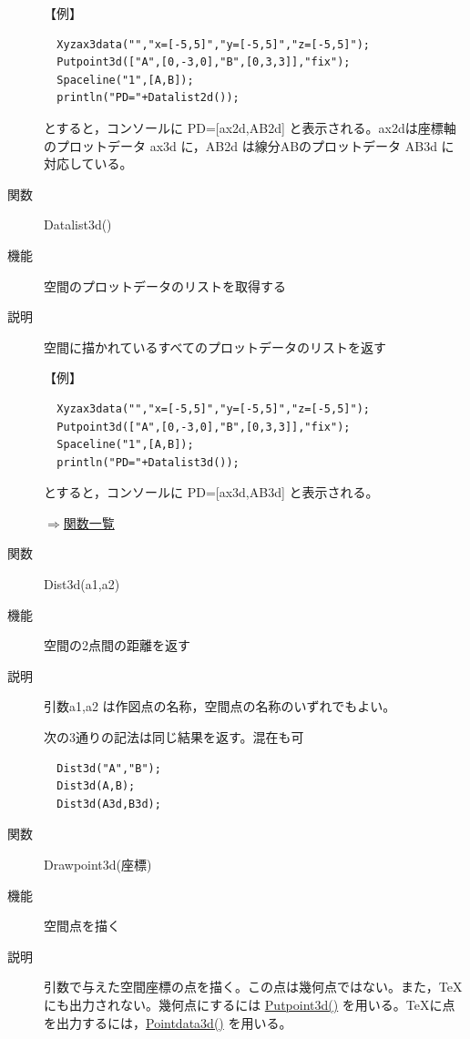 \documentclass[papersize,a4paper,12pt,uplatex]{jsarticle}
\begin{document}
\begin{description}
\vspace{\baselineskip}
【例】
\begin{verbatim}
  Xyzax3data("","x=[-5,5]","y=[-5,5]","z=[-5,5]");
  Putpoint3d(["A",[0,-3,0],"B",[0,3,3]],"fix");
  Spaceline("1",[A,B]);
  println("PD="+Datalist2d());
\end{verbatim}
とすると，コンソールに  PD=[ax2d,AB2d]   と表示される。ax2dは座標軸のプロットデータ ax3d に，AB2d は線分ABのプロットデータ AB3d に対応している。

\vspace{\baselineskip}
\hypertarget{datalist}{}
\item[関数]  Datalist3d()
\item[機能]  空間のプロットデータのリストを取得する
\item[説明]  空間に描かれているすべてのプロットデータのリストを返す

\vspace{\baselineskip}
【例】
\begin{verbatim}
  Xyzax3data("","x=[-5,5]","y=[-5,5]","z=[-5,5]");
  Putpoint3d(["A",[0,-3,0],"B",[0,3,3]],"fix");
  Spaceline("1",[A,B]);
  println("PD="+Datalist3d());
\end{verbatim}
とすると，コンソールに  PD=[ax3d,AB3d]   と表示される。


\begin{flushright} \hyperlink{functionlist}{$\Rightarrow$関数一覧}\end{flushright}

\hypertarget{dist3d}{}
\item[関数]  Dist3d(a1,a2)
\item[機能]  空間の2点間の距離を返す
\item[説明]  引数a1,a2 は作図点の名称，空間点の名称のいずれでもよい。

次の3通りの記法は同じ結果を返す。混在も可
\begin{verbatim}
  Dist3d("A","B");
  Dist3d(A,B);
  Dist3d(A3d,B3d);
\end{verbatim}
\vspace{\baselineskip}

\hypertarget{drawpoint3d}{}
\item[関数]  Drawpoint3d(座標)
\item[機能]  空間点を描く
\item[説明]  引数で与えた空間座標の点を描く。この点は幾何点ではない。また，TeX にも出力されない。幾何点にするには \hyperlink{putpoint3d}{Putpoint3d()} を用いる。TeXに点を出力するには，\hyperlink{pointdata3d}{Pointdata3d()} を用いる。


\end{description}
\end{document}
